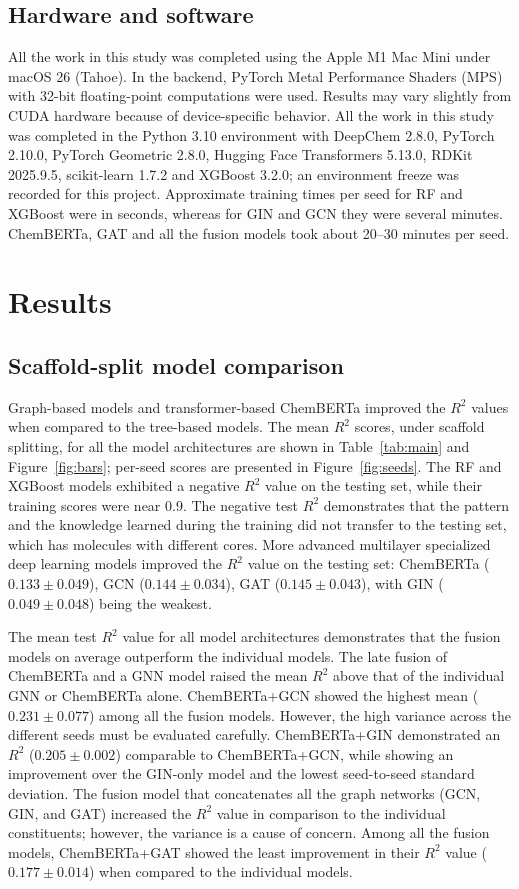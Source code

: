 \documentclass[11pt,a4paper]{article}
\begin{document}
\subsection{Hardware and software}
All the work in this study was completed using the Apple M1 Mac Mini under macOS 26 (Tahoe).
In the backend, PyTorch Metal Performance Shaders (MPS) with 32-bit floating-point computations were used.
Results may vary slightly from CUDA hardware because of device-specific behavior.
All the work in this study was completed in the Python 3.10 environment with DeepChem 2.8.0, PyTorch 2.10.0, PyTorch Geometric 2.8.0, Hugging Face Transformers 5.13.0, RDKit 2025.9.5, scikit-learn 1.7.2 and XGBoost 3.2.0; an environment freeze was recorded for this project.
Approximate training times per seed for RF and XGBoost were in seconds, whereas for GIN and GCN they were several minutes.
ChemBERTa, GAT and all the fusion models took about 20--30 minutes per seed.

\section{Results}
\label{sec:results}

\subsection{Scaffold-split model comparison}
Graph-based models and transformer-based ChemBERTa improved the $R^{2}$ values when compared to the tree-based models.
The mean $R^{2}$ scores, under scaffold splitting, for all the model architectures are shown in Table~\ref{tab:main} and Figure~\ref{fig:bars}; per-seed scores are presented in Figure~\ref{fig:seeds}.
The RF and XGBoost models exhibited a negative $R^{2}$ value on the testing set, while their training scores were near 0.9.
The negative test $R^{2}$ demonstrates that the pattern and the knowledge learned during the training did not transfer to the testing set, which has molecules with different cores.
More advanced multilayer specialized deep learning models improved the $R^{2}$ value on the testing set: ChemBERTa ($0.133 \pm 0.049$), GCN ($0.144 \pm 0.034$), GAT ($0.145 \pm 0.043$), with GIN ($0.049 \pm 0.048$) being the weakest.

The mean test $R^{2}$ value for all model architectures demonstrates that the fusion models on average outperform the individual models.
The late fusion of ChemBERTa and a GNN model raised the mean $R^{2}$ above that of the individual GNN or ChemBERTa alone.
ChemBERTa+GCN showed the highest mean ($0.231 \pm 0.077$) among all the fusion models.
However, the high variance across the different seeds must be evaluated carefully.
ChemBERTa+GIN demonstrated an $R^{2}$ ($0.205 \pm 0.002$) comparable to ChemBERTa+GCN, while showing an improvement over the GIN-only model and the lowest seed-to-seed standard deviation.
The fusion model that concatenates all the graph networks (GCN, GIN, and GAT) increased the $R^{2}$ value in comparison to the individual constituents; however, the variance is a cause of concern.
Among all the fusion models, ChemBERTa+GAT showed the least improvement in their $R^{2}$ value ($0.177 \pm 0.014$) when compared to the individual models.
\end{document}
